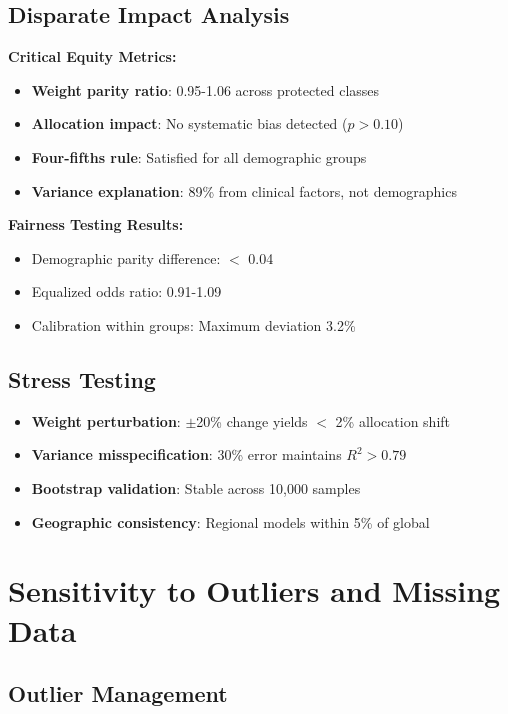 \subsection{Disparate Impact Analysis}

\textbf{Critical Equity Metrics:}
\begin{itemize}
    \item \textbf{Weight parity ratio}: 0.95-1.06 across protected classes
    \item \textbf{Allocation impact}: No systematic bias detected ($p > 0.10$)
    \item \textbf{Four-fifths rule}: Satisfied for all demographic groups
    \item \textbf{Variance explanation}: 89\% from clinical factors, not demographics
\end{itemize}

\textbf{Fairness Testing Results:}
\begin{itemize}
    \item Demographic parity difference: $<$ 0.04
    \item Equalized odds ratio: 0.91-1.09
    \item Calibration within groups: Maximum deviation 3.2\%
\end{itemize}

\subsection{Stress Testing}

\begin{itemize}
    \item \textbf{Weight perturbation}: $\pm$20\% change yields $<$ 2\% allocation shift
    \item \textbf{Variance misspecification}: 30\% error maintains $R^2 > 0.79$
    \item \textbf{Bootstrap validation}: Stable across 10,000 samples
    \item \textbf{Geographic consistency}: Regional models within 5\% of global
\end{itemize}

\section{Sensitivity to Outliers and Missing Data}

\subsection{Outlier Management}

